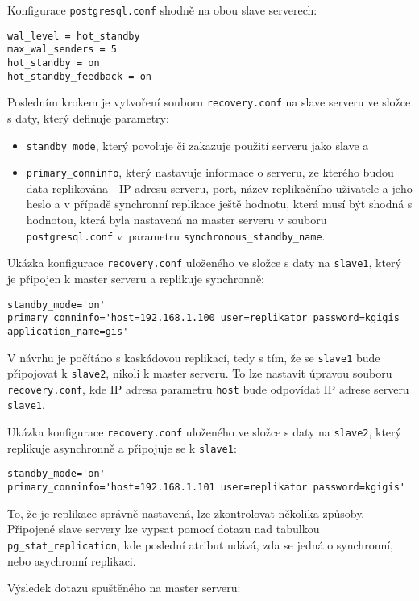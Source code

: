 Konfigurace \texttt{postgresql.conf} shodně na obou slave serverech:
\begin{lstlisting}
wal_level = hot_standby
max_wal_senders = 5
hot_standby = on
hot_standby_feedback = on
\end{lstlisting}

Posledním krokem je vytvoření souboru \texttt{recovery.conf} na slave serveru ve
složce s daty, který definuje parametry:
\begin{itemize}
  \item \texttt{standby\_mode}, který povoluje či zakazuje použití serveru jako
    slave a
  \item \texttt{primary\_conninfo}, který nastavuje informace o serveru, ze
    kterého budou data replikována - IP adresu serveru, port, název replikačního
    uživatele a jeho heslo a v případě synchronní replikace ještě hodnotu,
    která musí být shodná s hodnotou, která byla nastavená na master serveru v
    souboru \texttt{postgresql.conf} v~parametru
    \texttt{synchronous\_standby\_name}.
\end{itemize}

Ukázka konfigurace \texttt{recovery.conf} uloženého ve složce s daty na
\texttt{slave1}, který je připojen k master serveru a replikuje synchronně:
\begin{lstlisting}
standby_mode='on'
primary_conninfo='host=192.168.1.100 user=replikator password=kgigis application_name=gis'
\end{lstlisting}

V návrhu je počítáno s kaskádovou replikací, tedy s tím, že se \texttt{slave1}
bude připojovat k \texttt{slave2}, nikoli k master serveru. To lze nastavit
úpravou souboru \texttt{recovery.conf}, kde IP adresa parametru \texttt{host}
bude odpovídat IP adrese serveru \texttt{slave1}.

Ukázka konfigurace \texttt{recovery.conf} uloženého ve složce s daty na
\texttt{slave2}, který replikuje asynchronně a připojuje se k
\texttt{slave1}:
\begin{lstlisting}
standby_mode='on'
primary_conninfo='host=192.168.1.101 user=replikator password=kgigis'
\end{lstlisting}

To, že je replikace správně nastavená, lze zkontrolovat několika způsoby.
Připojené slave servery lze vypsat pomocí dotazu nad tabulkou
\texttt{pg\_stat\_replication}, kde poslední atribut udává, zda se jedná o
synchronní, nebo asychronní replikaci.

Výsledek dotazu spuštěného na master serveru:

